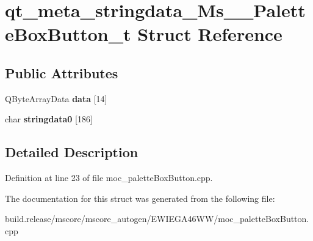 \hypertarget{structqt__meta__stringdata___ms_____palette_box_button__t}{}\section{qt\+\_\+meta\+\_\+stringdata\+\_\+\+Ms\+\_\+\+\_\+\+Palette\+Box\+Button\+\_\+t Struct Reference}
\label{structqt__meta__stringdata___ms_____palette_box_button__t}
\subsection*{Public Attributes}
\begin{DoxyCompactItemize}
\item 
\mbox{\label{structqt__meta__stringdata___ms_____palette_box_button__t_a73223e47ddef0d3d88570357b5e28303}} 
Q\+Byte\+Array\+Data {\bfseries data} \mbox{[}14\mbox{]}
\item 
\mbox{\label{structqt__meta__stringdata___ms_____palette_box_button__t_ad2c9727c5d753f20efc2e39300f359c5}} 
char {\bfseries stringdata0} \mbox{[}186\mbox{]}
\end{DoxyCompactItemize}


\subsection{Detailed Description}


Definition at line 23 of file moc\+\_\+palette\+Box\+Button.\+cpp.



The documentation for this struct was generated from the following file\+:\begin{DoxyCompactItemize}
\item 
build.\+release/mscore/mscore\+\_\+autogen/\+E\+W\+I\+E\+G\+A46\+W\+W/moc\+\_\+palette\+Box\+Button.\+cpp\end{DoxyCompactItemize}
